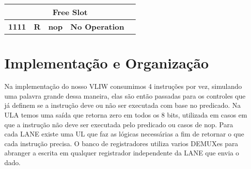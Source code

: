 \documentclass{article}
\begin{document}
\begin{table}[H]
\begin{tabular}{|c|*{4}{c|}}
        \multicolumn{5}{|c|}{\textbf{Free Slot}}                                                                                                                                                                                                                 \\ \hline 
        \multicolumn{1}{|c|}{\textbf{1111}}   & \multicolumn{1}{c|}{\textbf{R}}     & \multicolumn{1}{c|}{\textbf{nop}}       & \multicolumn{1}{c|}{\textbf{No Operation}}         & \multicolumn{1}{c|}{\textbf{}}                                              \\ \hline
      \end{tabular}
    \end{table}

    \section{Implementação e Organização}

    Na implementação do nosso VLIW consumimos 4 instruções por vez, simulando uma palavra grande dessa maneira, elas são então passadas para os controles que já definem se a instrução deve ou não ser executada com base no predicado.
    Na ULA temos uma saída que retorna zero em todos os 8 bits, utilizada em casos em que a instrução não deve ser executada pelo predicado ou casos de nop. Para cada LANE existe uma UL que faz as lógicas necessárias a fim de retornar o que cada instrução precisa.
    O banco de registradores utiliza varios DEMUXes para abranger a escrita em qualquer registrador independente da LANE que envia o dado.
\end{document}
